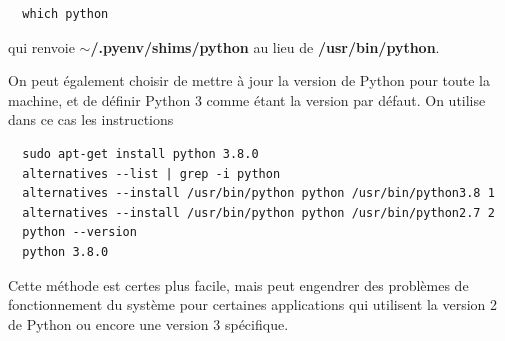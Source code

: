 \documentclass[twoside,a4paper,11pt,frenchb,openany]{report}
\begin{document}
\begin{verbatim}
  which python
\end{verbatim}

qui renvoie \textbf{$\sim$/.pyenv/shims/python} au lieu de \textbf{/usr/bin/python}.

On peut également choisir de mettre à jour la version de Python pour toute la machine, et de définir Python 3 comme étant la version par défaut. On utilise dans ce cas les instructions

\begin{verbatim}
  sudo apt-get install python 3.8.0
  alternatives --list | grep -i python
  alternatives --install /usr/bin/python python /usr/bin/python3.8 1
  alternatives --install /usr/bin/python python /usr/bin/python2.7 2
  python --version
  python 3.8.0
\end{verbatim}

Cette méthode est certes plus facile, mais peut engendrer des problèmes de fonctionnement du système pour certaines applications qui utilisent la version 2 de Python ou encore une version 3 spécifique.
\end{document}
